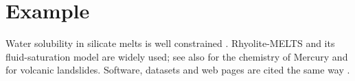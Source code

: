 \documentclass[11pt,a4paper]{article}
\begin{document}
\section*{Example}

Water solubility in silicate melts is well constrained
\citep{Silver1989}. Rhyolite-MELTS and its fluid-saturation model
\citep{Gualda2012,Ghiorso2015} are widely used; see also
\citet{Nittler2018} for the chemistry of Mercury and \citet{Roberti2021}
for volcanic landslides. Software, datasets and web pages are cited the same
way \citep{QGIS2024,GVP2013,BRGMweb}.


\end{document}
